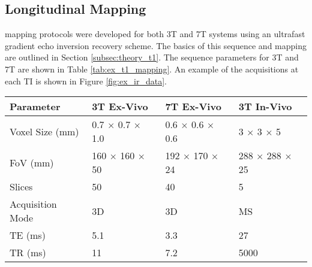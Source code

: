 \subsection{Longitudinal \tone Mapping}
\tone mapping protocols were developed for both 3T and 7T systems using an ultrafast gradient echo inversion recovery scheme. The basics of this sequence and \tone mapping are outlined in Section \ref{subsec:theory_t1}. The sequence parameters for 3T and 7T are shown in Table \ref{tab:ex_t1_mapping}. An example of the acquisitions at each \ac{TI} is shown in Figure \ref{fig:ex_ir_data}.

\begin{table}[H]
	\centering
	\begin{tabularx}{1.0\textwidth}{X|X|X|X}
		\textbf{Parameter}                        & \textbf{3T Ex-Vivo}                                & \textbf{7T Ex-Vivo}                                & \textbf{3T In-Vivo}                                                \\ \hline
		Voxel Size (mm)                           & 0.7 $\times$ 0.7 $\times$ 1.0                                    & 0.6 $\times$ 0.6 $\times$ 0.6                                    & 3 $\times$ 3 $\times$ 5                                                          \\ \hline
		FoV (mm)                                  & 160 $\times$ 160 $\times$ 50                                     & 192 $\times$ 170 $\times$ 24                                     & 288 $\times$ 288 $\times$ 25                                                     \\ \hline
		Slices                                    & 50                                                 & 40                                                 & 5                                                                  \\ \hline
		Acquisition Mode                          & 3D                                                 & 3D                                                 & MS                                                                 \\ \hline
		TE (ms)                                   & 5.1                                                & 3.3                                                & 27                                                                 \\ \hline
		TR (ms)                                   & 11                                                 & 7.2                                                & 5000                                                               \\ \hline

\end{tabularx}
\end{table}
